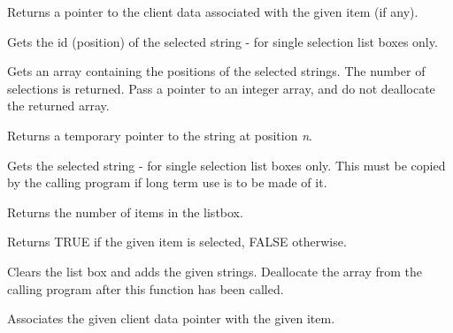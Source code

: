 
Returns a pointer to the client data associated with the given item (if any).



Gets the id (position) of the selected string - for single selection list boxes only.



Gets an array containing the positions of the selected strings. The number of selections
is returned.  Pass a pointer to an integer array, and do not deallocate the returned array.



Returns a temporary pointer to the string at position {\it n}.



Gets the selected string - for single selection list boxes only. This
must be copied by the calling program if long term use is to be made of
it.



Returns the number of items in the listbox.



Returns TRUE if the given item is selected, FALSE otherwise.



Clears the list box and adds the given strings. Deallocate the array from the calling program
after this function has been called.



Associates the given client data pointer with the given item.

